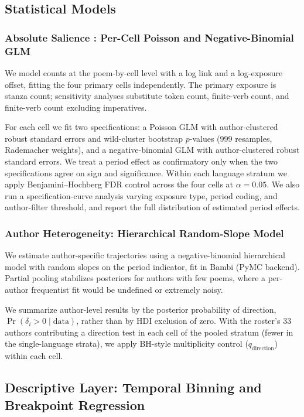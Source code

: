 \documentclass[12pt]{interact}
\theoremstyle{plain}%
\theoremstyle{definition}
\theoremstyle{remark}
\begin{document}
\subsection{Statistical Models}

\subsubsection{Absolute Salience : Per-Cell Poisson and Negative-Binomial GLM}

We model counts at the poem-by-cell level with a log link and a log-exposure offset, fitting the four primary cells independently. The primary exposure is stanza count; sensitivity analyses substitute token
count, finite-verb count, and finite-verb count excluding imperatives.

For each cell we fit two specifications: a Poisson GLM with author-clustered robust standard errors and wild-cluster bootstrap $p$-values (999 resamples, Rademacher weights), and a negative-binomial GLM with author-clustered robust standard errors. We treat a period effect as confirmatory only when the two specifications agree on sign and significance. Within each language stratum we apply Benjamini–Hochberg FDR control across the four cells at $\alpha = 0.05$. We also run a specification-curve analysis varying exposure type, period coding, and author-filter threshold, and report the full distribution of estimated period effects.

\subsubsection{Author Heterogeneity: Hierarchical Random-Slope Model}

We estimate author-specific trajectories using a negative-binomial hierarchical model with random slopes on the period indicator, fit in Bambi (PyMC backend). Partial pooling stabilizes posteriors for authors with few poems, where a per-author frequentist fit would be undefined or extremely noisy.

We summarize author-level results by the posterior probability of direction, $\Pr(\delta_i > 0 \mid \text{data})$, rather than by HDI exclusion of zero. With the roster's $33$ authors contributing a direction test in each cell of the pooled stratum (fewer in the single-language strata), we apply BH-style
multiplicity control ($q_{\text{direction}}$) within each cell.

\subsection{Descriptive Layer: Temporal Binning and Breakpoint Regression}
\end{document}
